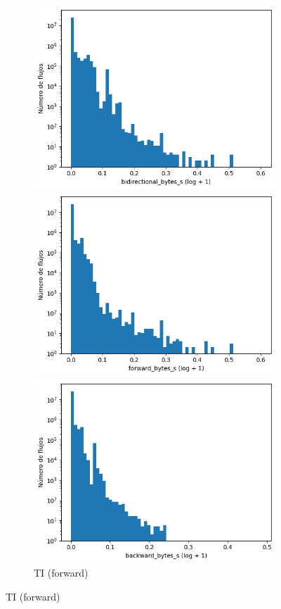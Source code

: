 \begin{figure}[H]
\begin{subfigure}[b]{0.26\textwidth}
        \includegraphics[width=\linewidth]{media/packet_pincer_toniot/bidirectional_bytes_s_log_x_log_y.png}
        \caption{TI (bidir.)}
        \includegraphics[width=\textwidth]{media/packet_pincer_toniot/forward_bytes_s_log_x_log_y.png}
        \caption{TI (forward)}
        \includegraphics[width=\textwidth]{media/packet_pincer_toniot/backward_bytes_s_log_x_log_y.png}

\end{subfigure}
\end{figure}
